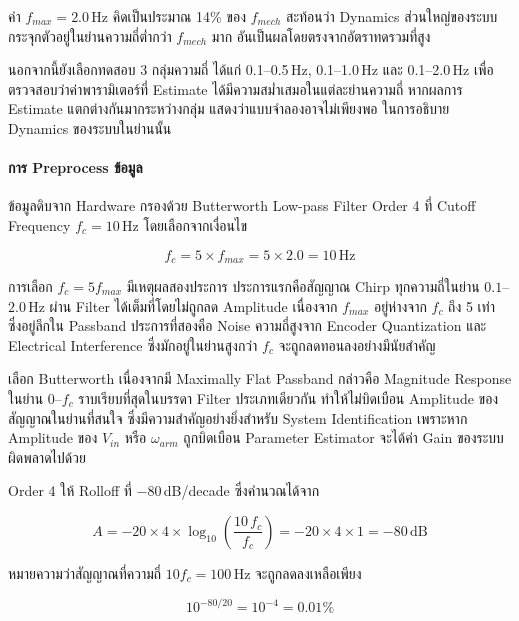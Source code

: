 ค่า $f_{max} = 2.0$\,Hz คิดเป็นประมาณ 14\% ของ $f_{mech}$ สะท้อนว่า
Dynamics ส่วนใหญ่ของระบบกระจุกตัวอยู่ในย่านความถี่ต่ำกว่า $f_{mech}$ มาก
อันเป็นผลโดยตรงจากอัตราทดรวมที่สูง

นอกจากนี้ยังเลือกทดสอบ 3 กลุ่มความถี่ ได้แก่
0.1--0.5\,Hz, 0.1--1.0\,Hz และ 0.1--2.0\,Hz
เพื่อตรวจสอบว่าค่าพารามิเตอร์ที่ Estimate ได้มีความสม่ำเสมอในแต่ละย่านความถี่
หากผลการ Estimate แตกต่างกันมากระหว่างกลุ่ม แสดงว่าแบบจำลองอาจไม่เพียงพอ
ในการอธิบาย Dynamics ของระบบในย่านนั้น

\paragraph{การ Preprocess ข้อมูล}

ข้อมูลดิบจาก Hardware กรองด้วย Butterworth Low-pass Filter Order 4
ที่ Cutoff Frequency $f_c = 10$\,Hz โดยเลือกจากเงื่อนไข

\begin{equation}
  f_c = 5 \times f_{max} = 5 \times 2.0 = 10\,\text{Hz}
  \label{eq:fc}
\end{equation}

การเลือก $f_c = 5 f_{max}$ มีเหตุผลสองประการ ประการแรกคือสัญญาณ Chirp
ทุกความถี่ในย่าน $0.1$--$2.0$\,Hz ผ่าน Filter ได้เต็มที่โดยไม่ถูกลด Amplitude
เนื่องจาก $f_{max}$ อยู่ห่างจาก $f_c$ ถึง 5 เท่า ซึ่งอยู่ลึกใน Passband
ประการที่สองคือ Noise ความถี่สูงจาก Encoder Quantization และ Electrical
Interference ซึ่งมักอยู่ในย่านสูงกว่า $f_c$ จะถูกลดทอนลงอย่างมีนัยสำคัญ

เลือก Butterworth เนื่องจากมี Maximally Flat Passband กล่าวคือ
Magnitude Response ในย่าน $0$--$f_c$ ราบเรียบที่สุดในบรรดา Filter
ประเภทเดียวกัน ทำให้ไม่บิดเบือน Amplitude ของสัญญาณในย่านที่สนใจ
ซึ่งมีความสำคัญอย่างยิ่งสำหรับ System Identification เพราะหาก Amplitude
ของ $V_{in}$ หรือ $\omega_{arm}$ ถูกบิดเบือน Parameter Estimator
จะได้ค่า Gain ของระบบผิดพลาดไปด้วย

Order 4 ให้ Rolloff ที่ $-80$\,dB/decade ซึ่งคำนวณได้จาก

\begin{equation}
  A = -20 \times 4 \times \log_{10}\!\left(\frac{10\,f_c}{f_c}\right)
    = -20 \times 4 \times 1
    = -80\,\text{dB}
  \label{eq:attenuation}
\end{equation}

หมายความว่าสัญญาณที่ความถี่ $10 f_c = 100$\,Hz จะถูกลดลงเหลือเพียง

\begin{equation}
  10^{-80/20} = 10^{-4} = 0.01\%
\end{equation}

